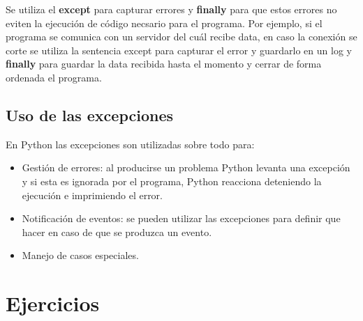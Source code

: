 Se utiliza el \textbf{except} para capturar errores y \textbf{finally} para que estos errores no eviten la ejecución de código necsario para el programa. Por ejemplo, si el programa se comunica con un servidor del cuál recibe data, en caso la conexión se corte se utiliza la sentencia except para capturar el error y guardarlo en un log y \textbf{finally} para guardar la data recibida hasta el momento y cerrar de forma ordenada el programa.\\



\subsection{Uso de las excepciones}

En Python las excepciones son utilizadas sobre todo para:

\begin{itemize}
\item Gestión de errores: al producirse un problema Python levanta una excepción y si esta es ignorada por el programa, Python reacciona deteniendo la ejecución e imprimiendo el error.

\item Notificación de eventos: se pueden utilizar las excepciones para definir que hacer en caso de que se produzca un evento.

\item Manejo de casos especiales.
\end{itemize}


\section{Ejercicios}

